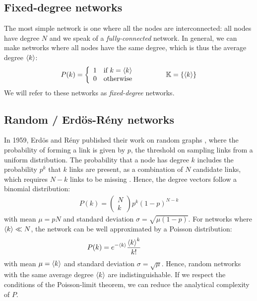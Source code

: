 \subsection{Fixed-degree networks}
The most simple network is one where all the nodes are interconnected: all nodes have degree $N$ and we speak of a \textsl{fully-connected} network. In general, we can make networks where all nodes have the same degree, which is thus the average degree ${\langle k\rangle}$:
\begin{align}
P(k) = \left\{\begin{array}{ll}1 & \text{if } k=\kmean \\0 & \text{otherwise}\end{array}\right. \hspace{15mm} \K = \{ \kmean \} \label{eq:diracpdf}
\end{align}
We will refer to these networks as \textsl{fixed-degree} networks. 


\subsection{Random / Erd{\"o}s-R{\'e}ny networks}
In 1959, Erd{\"o}s and R{\'e}ny published their work on random graphs \cite{RandomGraphs1959}, where the probability of forming a link is given by $p$, the threshold on sampling links from a uniform distribution. The probability that a node has degree $k$ includes the probability $p^k$ that $k$ links are present, as a combination of $N$ candidate links, which requires $N-k$ links to be missing \cite{BarabasiNetworkBook2016}. Hence, the degree vectors follow a binomial distribution:
\begin{align}
P(k)=\left(\begin{array}{c}N \\ k\end{array}\right) p^{k}(1-p)^{N-k} \label{eq:binomialpdf}
\end{align}
with mean $\mu = pN$ and standard deviation $\sigma = \sqrt{\mu(1-p)}$. For networks where ${\langle k\rangle} \ll N$, the network can be well approximated by a Poisson distribution:
\begin{align}
P(k) = e^{-\kmean} \frac{\kmean^{k}}{k !} \hspace{15mm} \label{eq:poissonpdf}
\end{align}
with mean $\mu = {\langle k\rangle}$ and standard deviation $\sigma = \sqrt{\mu}$. Hence, random networks with the same average degree ${\langle k\rangle}$ are indistinguishable. If we respect the conditions of the Poisson-limit theorem, we can reduce the analytical complexity of $P$. 

